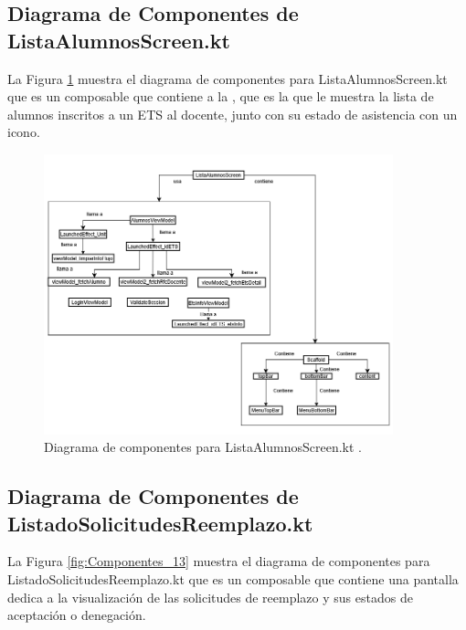 \newpage

\subsection{Diagrama de Componentes de ListaAlumnosScreen.kt}

La Figura \ref{fig:Componentes_12} muestra el diagrama de componentes para ListaAlumnosScreen.kt que es un composable que contiene a la , que es la que le muestra la lista de alumnos inscritos a un ETS al docente, junto con su estado de asistencia con un icono.

\begin{figure}[htbp!]
	\begin{center}
		\includegraphics[width=0.9\textwidth]{DiagramasMoviles/DCM (25)}
		\caption{Diagrama de componentes para ListaAlumnosScreen.kt .}
		\label{fig:Componentes_12}
	\end{center}
\end{figure}

\newpage

\subsection{Diagrama de Componentes de ListadoSolicitudesReemplazo.kt}

La Figura \ref{fig:Componentes_13} muestra el diagrama de componentes para ListadoSolicitudesReemplazo.kt que es un composable que contiene una pantalla dedica a la visualización de las solicitudes de reemplazo y sus estados de aceptación o denegación. 

